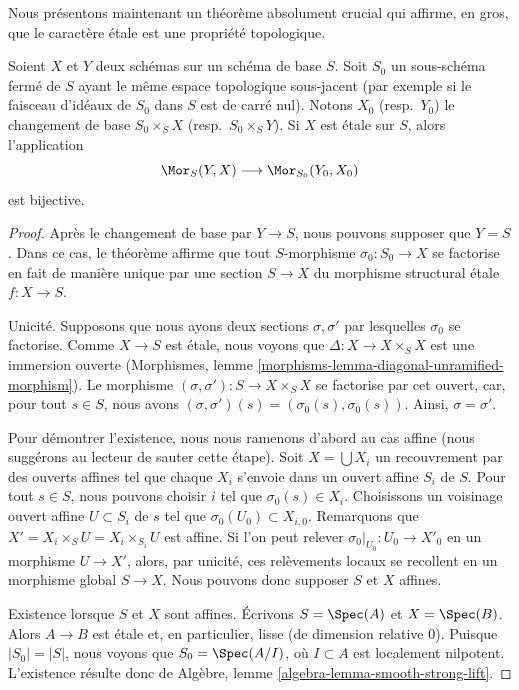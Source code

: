 \noindent
Nous présentons maintenant un théorème absolument crucial qui affirme, en gros,
que le caractère \'etale est une propriété topologique.

\begin{theorem}
\label{theorem-etale-topological}
Soient $X$ et $Y$ deux schémas sur un schéma de base $S$. Soit $S_0$ un sous-schéma fermé
de $S$ ayant le même espace topologique sous-jacent
(par exemple si le faisceau d'idéaux de $S_0$ dans $S$ est de carré nul).
Notons $X_0$ (resp.\ $Y_0$) le changement de base $S_0 \times_S X$
(resp.\ $S_0 \times_S Y$).
Si $X$ est \'etale sur $S$, alors l'application
$$
\Mor_S(Y, X) \longrightarrow \Mor_{S_0}(Y_0, X_0)
$$
est bijective.
\end{theorem}

\begin{proof}
Après le changement de base par $Y \to S$, nous pouvons supposer que $Y = S$.
Dans ce cas, le théorème affirme que tout $S$-morphisme $\sigma_0 : S_0 \to X$
se factorise en fait de manière unique par une section $S \to X$ du
morphisme structural \'etale $f : X \to S$.

\medskip\noindent
Unicité. Supposons que nous ayons deux sections $\sigma, \sigma'$
par lesquelles $\sigma_0$ se factorise. Comme $X \to S$ est \'etale,
nous voyons que $\Delta : X \to X \times_S X$ est une immersion ouverte
(Morphismes, lemme \ref{morphisms-lemma-diagonal-unramified-morphism}).
Le morphisme $(\sigma, \sigma') : S \to X \times_S X$ se factorise
par cet ouvert, car, pour tout $s \in S$, nous avons
$(\sigma, \sigma')(s) = (\sigma_0(s), \sigma_0(s))$. Ainsi,
$\sigma = \sigma'$.

\medskip\noindent
Pour démontrer l'existence, nous nous ramenons d'abord au cas affine
(nous suggérons au lecteur de sauter cette étape).
Soit $X = \bigcup X_i$ un recouvrement par des ouverts affines tel
que chaque $X_i$ s'envoie dans un ouvert affine $S_i$ de $S$.
Pour tout $s \in S$, nous pouvons choisir $i$ tel que
$\sigma_0(s) \in X_i$.
Choisissons un voisinage ouvert affine $U \subset S_i$ de $s$
tel que $\sigma_0(U_0) \subset X_{i, 0}$. Remarquons que
$X' = X_i \times_S U = X_i \times_{S_i} U$ est affine.
Si l'on peut relever $\sigma_0|_{U_0} : U_0 \to X'_0$ en
un morphisme $U \to X'$, alors, par unicité, ces relèvements locaux se recollent
en un morphisme global $S \to X$. Nous pouvons donc supposer $S$ et
$X$ affines.

\medskip\noindent
Existence lorsque $S$ et $X$ sont affines. Écrivons $S = \Spec(A)$
et $X = \Spec(B)$. Alors $A \to B$ est \'etale et, en particulier,
lisse (de dimension relative $0$). Puisque $|S_0| = |S|$, nous voyons
que $S_0 = \Spec(A/I)$, où $I \subset A$ est localement nilpotent.
L'existence résulte donc de
Algèbre, lemme \ref{algebra-lemma-smooth-strong-lift}.
\end{proof}

